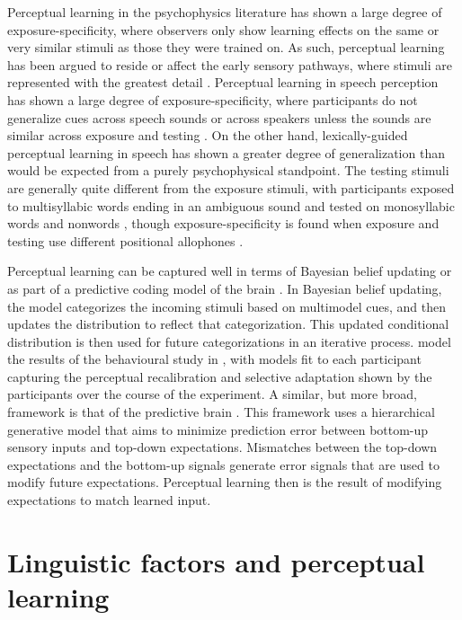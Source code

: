 Perceptual learning in the psychophysics literature has shown a large degree of exposure-specificity, where observers only show learning effects on the same or very similar stimuli as those they were trained on. As such, perceptual learning has been argued to reside or affect the early sensory pathways, where stimuli are represented with the greatest detail \citep{Gilbert2001}.  Perceptual learning in speech perception has shown a large degree of exposure-specificity, where participants do not generalize cues across speech sounds \citep{Reinisch2014} or across speakers unless the sounds are similar across exposure and testing \citep{Eisner2005, Kraljic2005, Kraljic2007, Reinisch2013a}.  On the other hand, lexically-guided perceptual learning in speech has shown a greater degree of generalization than would be expected from a purely psychophysical standpoint.  The testing stimuli are generally quite different from the exposure stimuli, with participants exposed to multisyllabic words ending in an ambiguous sound and tested on monosyllabic words \citep{Reinisch2013} and nonwords \citep{Norris2003, Kraljic2005}, though exposure-specificity is found when exposure and testing use different positional allophones \citep{Mitterer2013}.

Perceptual learning can be captured well in terms of Bayesian belief updating \citep{Kleinschmidt2011} or as part of a predictive coding model of the brain \citep{Clark2013}.  
In Bayesian belief updating, the model categorizes the incoming stimuli based on multimodel cues, and then updates the distribution to reflect that categorization.  
This updated conditional distribution is then used for future categorizations in an iterative process.  
\citet{Kleinschmidt2011} model the results of the behavioural study in \citet{Vroomen2007}, with models fit to each participant capturing the perceptual recalibration and selective adaptation shown by the participants over the course of the experiment.  
A similar, but more broad, framework is that of the predictive brain \citep{Clark2013}. 
This framework uses a hierarchical generative model that aims to minimize prediction error between bottom-up sensory inputs and top-down expectations.  
Mismatches between the top-down expectations and the bottom-up signals generate error signals that are used to modify future expectations.  
Perceptual learning then is the result of modifying expectations to match learned input.

\section{Linguistic factors and perceptual learning}
\label{sec:linguistic}

